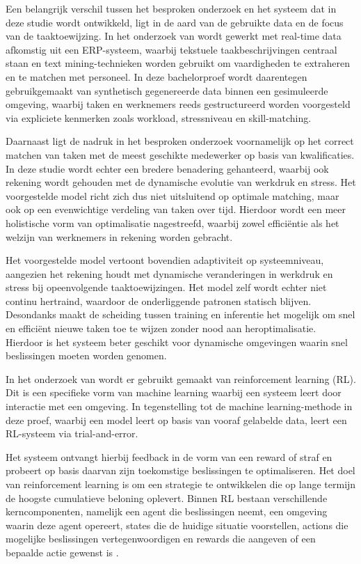 \vspace{1em}Een belangrijk verschil tussen het besproken onderzoek en het systeem dat in deze studie wordt ontwikkeld, ligt in de aard van de gebruikte data en de focus van de taaktoewijzing. In het onderzoek van \textcite{Arslan_2024} wordt gewerkt met real-time data afkomstig uit een ERP-systeem, waarbij tekstuele taakbeschrijvingen centraal staan en text mining-technieken worden gebruikt om vaardigheden te extraheren en te matchen met personeel. In deze bachelorproef wordt daarentegen gebruikgemaakt van synthetisch gegenereerde data binnen een gesimuleerde omgeving, waarbij taken en werknemers reeds gestructureerd worden voorgesteld via expliciete kenmerken zoals workload, stressniveau en skill-matching.

Daarnaast ligt de nadruk in het besproken onderzoek voornamelijk op het correct matchen van taken met de meest geschikte medewerker op basis van kwalificaties. In deze studie wordt echter een bredere benadering gehanteerd, waarbij ook rekening wordt gehouden met de dynamische evolutie van werkdruk en stress. Het voorgestelde model richt zich dus niet uitsluitend op optimale matching, maar ook op een evenwichtige verdeling van taken over tijd. Hierdoor wordt een meer holistische vorm van optimalisatie nagestreefd, waarbij zowel efficiëntie als het welzijn van werknemers in rekening worden gebracht.

Het voorgestelde model vertoont bovendien adaptiviteit op systeemniveau, aangezien het rekening houdt met dynamische veranderingen in werkdruk en stress bij opeenvolgende taaktoewijzingen. Het model zelf wordt echter niet continu hertraind, waardoor de onderliggende patronen statisch blijven. Desondanks maakt de scheiding tussen training en inferentie het mogelijk om snel en efficiënt nieuwe taken toe te wijzen zonder nood aan heroptimalisatie. Hierdoor is het systeem beter geschikt voor dynamische omgevingen waarin snel beslissingen moeten worden genomen.

\vspace{1em}In het onderzoek van \textcite{Tonazzo} wordt er gebruikt gemaakt van reinforcement learning (RL). Dit is een specifieke vorm van machine learning waarbij een systeem leert door interactie met een omgeving. In tegenstelling tot de machine learning-methode in deze proef, waarbij een model leert op basis van vooraf gelabelde data, leert een RL-systeem via trial-and-error.

Het systeem ontvangt hierbij feedback in de vorm van een reward of straf en probeert op basis daarvan zijn toekomstige beslissingen te optimaliseren. Het doel van reinforcement learning is om een strategie te ontwikkelen die op lange termijn de hoogste cumulatieve beloning oplevert. Binnen RL bestaan verschillende kerncomponenten, namelijk een agent die beslissingen neemt, een omgeving waarin deze agent opereert, states die de huidige situatie voorstellen, actions die mogelijke beslissingen vertegenwoordigen en rewards die aangeven of een bepaalde actie gewenst is \autocite{Tonazzo}.

